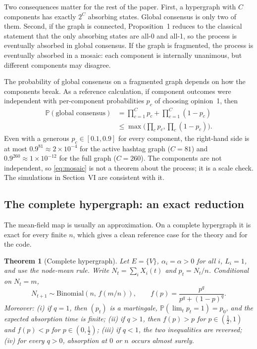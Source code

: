\documentclass[conference]{IEEEtran}
\newcommand{\Prob}{\mathbb{P}}
\newtheorem{theorem}{Theorem}
\begin{document}
Two consequences matter for the rest of the paper. First, a hypergraph with $C$ components has exactly $2^{C}$ absorbing states. Global consensus is only two of them. Second, if the graph is connected, Proposition~1 reduces to the classical statement that the only absorbing states are all-0 and all-1, so the process is eventually absorbed in global consensus. If the graph is fragmented, the process is eventually absorbed in a mosaic: each component is internally unanimous, but different components may disagree.

The probability of global consensus on a fragmented graph depends on how the components break. As a reference calculation, if component outcomes were independent with per-component probabilities $p_c$ of choosing opinion~1, then
\begin{equation}
\begin{aligned}
\Prob(\text{global consensus})
&=\prod_{c=1}^{C}p_c+\prod_{c=1}^{C}(1-p_c)\\
&\le \max\!\Big(\prod_c p_c,\prod_c(1-p_c)\Big).
\end{aligned}
\label{eq:mosaic}
\end{equation}
Even with a generous $p_c\in[0.1,0.9]$ for every component, the right-hand side is at most $0.9^{81}\approx2\times10^{-4}$ for the active hashtag graph ($C=81$) and $0.9^{260}\approx1\times10^{-12}$ for the full graph ($C=260$). The components are not independent, so \eqref{eq:mosaic} is not a theorem about the process; it is a scale check. The simulations in Section~VI are consistent with it.

\subsection{The complete hypergraph: an exact reduction}
The mean-field map is usually an approximation. On a complete hypergraph it is exact for every finite $n$, which gives a clean reference case for the theory and for the code.

\begin{theorem}[Complete hypergraph]\label{thm:complete}
Let $E=\{V\}$, $\alpha_i=\alpha>0$ for all $i$, $L_i=1$, and use the node-mean rule. Write $N_t=\sum_i X_i(t)$ and $p_t=N_t/n$. Conditional on $N_t=m$,
\begin{equation}
N_{t+1}\sim\mathrm{Binomial}\!\left(n,\,f(m/n)\right),
\qquad
f(p)=\frac{p^{q}}{p^{q}+(1-p)^{q}}.
\label{eq:binomial}
\end{equation}
Moreover: (i) if $q=1$, then $(p_t)$ is a martingale, $\Prob(\lim_t p_t=1)=p_0$, and the expected absorption time is finite; (ii) if $q>1$, then $f(p)>p$ for $p\in(\tfrac12,1)$ and $f(p)<p$ for $p\in(0,\tfrac12)$; (iii) if $q<1$, the two inequalities are reversed; (iv) for every $q>0$, absorption at $0$ or $n$ occurs almost surely.
\end{theorem}
\end{document}
